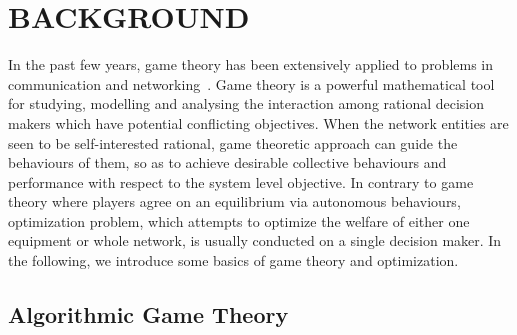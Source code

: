 \chapter{BACKGROUND}
\label{background}
In the past few years, game theory has been extensively applied to problems in communication and networking~\cite{Neel06analysisand, Wang_gtc_crn_survey_2010}.
Game theory is a powerful mathematical tool for studying, modelling and analysing the interaction among rational decision makers which have potential conflicting objectives.
When the network entities are seen to be self-interested rational, game theoretic approach can guide the behaviours of them, so as to achieve desirable collective behaviours and performance with respect to the system level objective.
In contrary to game theory where players agree on an equilibrium via autonomous behaviours, optimization problem, which attempts to optimize the welfare of either one equipment or whole network, is usually conducted on a single decision maker.
In the following, we introduce some basics of game theory and optimization.





\section{Algorithmic Game Theory}


